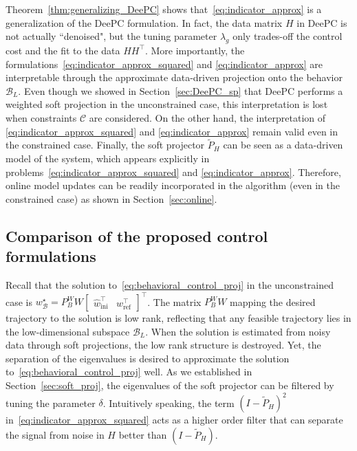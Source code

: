 \documentclass[letterpaper, 10 pt, conference]{ieeeconf}
\begin{document}
Theorem~\ref{thm:generalizing_DeePC} shows that~\eqref{eq:indicator_approx} is a generalization of the \gls{DeePC} formulation.
In fact, the data matrix $H$ in \gls{DeePC} is not actually ``denoised", but the tuning parameter $\lambda_g$ only trades-off the control cost and the fit to the data $HH^\top$.
More importantly, the formulations~\eqref{eq:indicator_approx_squared} and \eqref{eq:indicator_approx} are interpretable through the approximate data-driven projection onto the behavior $\mathcal{B}_L$.
Even though we showed in Section~\ref{sec:DeePC_sp} that \gls{DeePC} performs a weighted soft projection in the unconstrained case, this interpretation is lost when constraints $\mathcal{C}$ are considered.
On the other hand, the interpretation of \eqref{eq:indicator_approx_squared} and \eqref{eq:indicator_approx} remain valid even in the constrained case.
Finally, the soft projector $\tilde{P}_H$ can be seen as a data-driven model of the system, which appears explicitly in problems~\eqref{eq:indicator_approx_squared} and \eqref{eq:indicator_approx}. 
Therefore, online model updates can be readily incorporated in the algorithm (even in the constrained case) as shown in Section~\ref{sec:online}.

\subsection{Comparison of the proposed control formulations}
Recall that the solution to~\eqref{eq:behavioral_control_proj} in the unconstrained case is $w^\star_\mathcal{B} = P_B^W W\begin{bmatrix}
    \hat{w}_\mathrm{ini}^\top & w_\mathrm{ref}^\top
\end{bmatrix}^\top$. 
The matrix $P_B^W W$ mapping the desired trajectory to the solution is low rank, reflecting that any feasible trajectory lies in the low-dimensional subspace $\mathcal{B}_L$.
When the solution is estimated from noisy data through soft projections, the low rank structure is destroyed.
Yet, the separation of the eigenvalues is desired to approximate the solution to~\eqref{eq:behavioral_control_proj} well.
As we established in Section~\ref{sec:soft_proj}, the eigenvalues of the soft projector can be filtered by tuning the parameter $\delta$.
Intuitively speaking, the term $(I - \tilde{P}_H)^2$ in~\eqref{eq:indicator_approx_squared} acts as a higher order filter that can separate the signal from noise in $H$ better than $(I - \tilde{P}_H)$.
\end{document}
